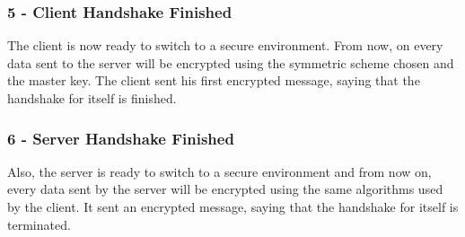 \subsubsection{5 - Client Handshake Finished}
\par
The client is now ready to switch to a secure environment. From now, on every data sent to the server will be encrypted using the symmetric scheme chosen and the master key. The client sent his first encrypted message, saying that the handshake for itself is finished.

\subsubsection{6 - Server Handshake Finished}
\par
Also, the server is ready to switch to a secure environment and from now on, every data sent by the server will be encrypted using the same algorithms used by the client. It sent an encrypted message, saying that the handshake for itself is terminated.
